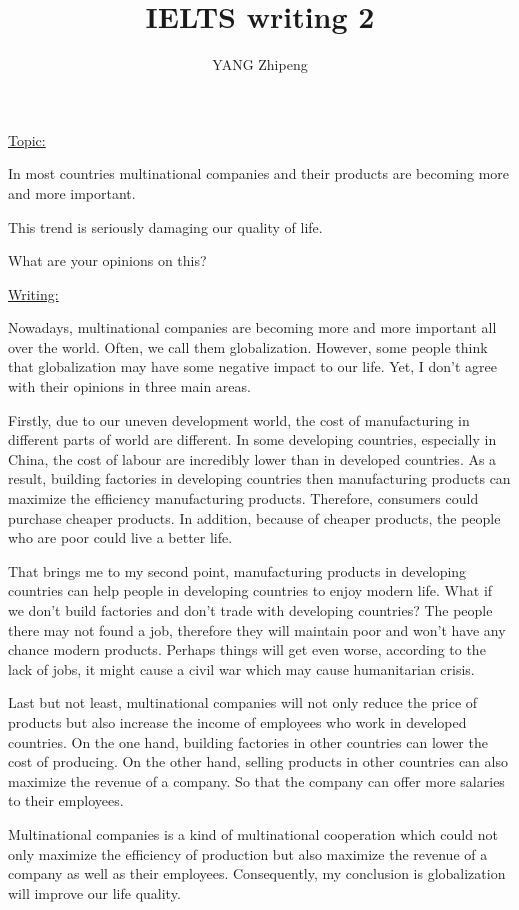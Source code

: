 \documentclass[UTF8]{ctexart}
\title{IELTS writing 2}
\author{YANG Zhipeng}
\date{}
\begin{document}
\maketitle
\noindent
\LARGE{\underline{Topic:}}

\normalsize{In most countries multinational companies and their products are becoming more and more important.

This trend is seriously damaging our quality of life.

What are your opinions on this?}

\noindent
\LARGE{\underline{Writing:}}

\normalsize{Nowadays, multinational companies are becoming more and more important all over the world. Often, we call them globalization. However, some people think that globalization may have some negative impact to our life. Yet, I don't agree with their opinions in three main areas.

Firstly, due to our uneven development world, the cost of manufacturing in different parts of world are different. In some developing countries, especially in China, the cost of labour are incredibly lower than in developed countries. As a result, building factories in developing countries then manufacturing products can maximize the efficiency manufacturing products. Therefore, consumers could purchase cheaper 
products. In addition, because of cheaper products, the people who are poor could live a better life.

That brings me to my second point, manufacturing products in developing countries can help people in developing countries to enjoy modern life. What if we don't build factories and don't trade with developing countries? The people there may not found a job, therefore they will maintain poor and won't have any chance modern products. Perhaps things will get even worse, according to the lack of jobs, it might cause a 
civil war which may cause humanitarian crisis.

Last but not least, multinational companies will not only reduce the price of products but also increase the income of employees who work in 
developed countries. On the one hand, building factories in other countries can lower the cost of producing. On the other hand, selling
products in other countries can also maximize the revenue of a company. So that the company can offer more salaries to their employees.

Multinational companies is a kind of multinational cooperation which could not only maximize the efficiency of production 
but also maximize the revenue of a company as well as their employees. Consequently, my conclusion is globalization will improve our life
quality.}
\end{document}

